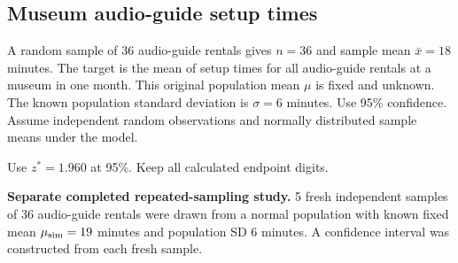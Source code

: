 \subsection{Museum audio-guide setup times}
\label{prob:c2-advanced-a}

A random sample of 36 audio-guide rentals gives $n=36$ and sample mean $\bar{x}=18$ minutes. The target is the mean of setup times for all audio-guide rentals at a museum in one month. This original population mean $\mu$ is fixed and unknown. The known population standard deviation is $\sigma=6$ minutes. Use 95\% confidence. Assume independent random observations and normally distributed sample means under the model.

Use $z^*=1.960$ at 95\%. Keep all calculated endpoint digits.

\textbf{Separate completed repeated-sampling study.} 5 fresh independent samples of 36 audio-guide rentals were drawn from a normal population with known fixed mean $\mu_{\rm sim}=19$ minutes and population SD 6 minutes. A confidence interval was constructed from each fresh sample.
